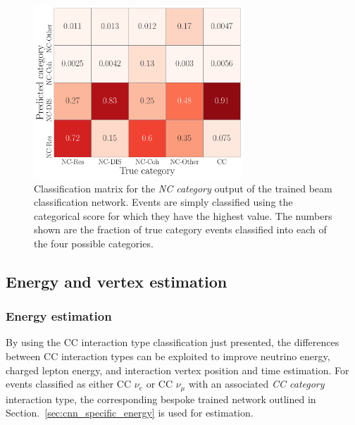 \begin{figure} %
    \includegraphics[width=0.7\textwidth]{diagrams/7-results/final_nc_cat_confusion.pdf}
    \caption[Classification matrix for the NC category output of the beam classification network]
    {Classification matrix for the \emph{NC category} output of the trained beam classification
        network. Events are simply classified using the categorical score for which they have the
        highest value. The numbers shown are the fraction of true category events classified into
        each of the four possible categories.}
    \label{fig:final_nc_cat_confusion}
\end{figure}

\subsection{Energy and vertex estimation} %
\label{sec:results_eval_energy} %

\subsubsection*{Energy estimation} %

By using the CC interaction type classification just presented, the differences between CC
interaction types can be exploited to improve neutrino energy, charged lepton energy, and
interaction vertex position and time estimation. For events classified as either CC $\nu_{e}$ or
CC $\nu_{\mu}$ with an associated \emph{CC category} interaction type, the corresponding bespoke
trained network outlined in Section.~\ref{sec:cnn_specific_energy} is used for estimation.

